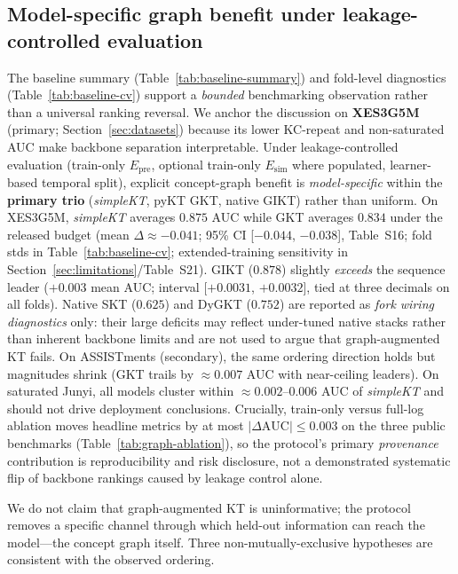 \documentclass[pdflatex,sn-mathphys-num]{sn-jnl}
\newcommand{\Epre}{\ensuremath{E_{\text{pre}}}}
\newcommand{\Esim}{\ensuremath{E_{\text{sim}}}}
\newcommand{\GKTdeltaci}{[$-0.044$, $-0.038$]}
\newcommand{\GIKTdeltaci}{[$+0.0031$, $+0.0032$]}
\begin{document}
\subsection{Model-specific graph benefit under leakage-controlled evaluation}
\label{sec:disc-model-specific}
The baseline summary (Table~\ref{tab:baseline-summary}) and fold-level
diagnostics (Table~\ref{tab:baseline-cv}) support a \emph{bounded}
benchmarking observation rather than a universal ranking reversal. We anchor
the discussion on \textbf{XES3G5M} (primary; Section~\ref{sec:datasets})
because its lower KC-repeat and non-saturated AUC make backbone separation
interpretable. Under leakage-controlled evaluation (train-only $\Epre$,
optional train-only $\Esim$ where populated, learner-based temporal split),
explicit concept-graph benefit is \emph{model-specific} within the
\textbf{primary trio} (\textit{simpleKT}, pyKT GKT, native GIKT) rather than
uniform. On XES3G5M, \textit{simpleKT} averages $0.875$ AUC while GKT averages
$0.834$ under the released budget (mean $\Delta{\approx}{-}0.041$; 95\% CI
\GKTdeltaci{}, Table~S16; fold stds in Table~\ref{tab:baseline-cv};
extended-training sensitivity in Section~\ref{sec:limitations}/Table~S21).
GIKT ($0.878$) slightly \emph{exceeds}
the sequence leader ($+0.003$ mean AUC; interval \GIKTdeltaci{}, tied at
three decimals on all folds). Native SKT ($0.625$)
and DyGKT ($0.752$) are reported as \emph{fork wiring diagnostics} only: their
large deficits may reflect under-tuned native stacks rather than inherent
backbone limits and are not used to argue that graph-augmented KT fails. On
ASSISTments (secondary), the same ordering direction holds but magnitudes shrink
(GKT trails by ${\approx}0.007$ AUC with near-ceiling leaders). On saturated
Junyi, all models cluster within ${\approx}0.002$--$0.006$ AUC of
\textit{simpleKT} and should not drive deployment conclusions. Crucially,
train-only versus full-log ablation moves headline metrics by at most
$|\Delta\text{AUC}|{\leq}0.003$ on the three public benchmarks
(Table~\ref{tab:graph-ablation}), so the protocol's primary \emph{provenance}
contribution is reproducibility and risk disclosure, not a demonstrated
systematic flip of backbone rankings caused by leakage control alone.

We do not claim that graph-augmented KT is uninformative; the protocol
removes a specific channel through which held-out information can reach the
model---the concept graph itself. Three non-mutually-exclusive hypotheses
are consistent with the observed ordering.
\end{document}
